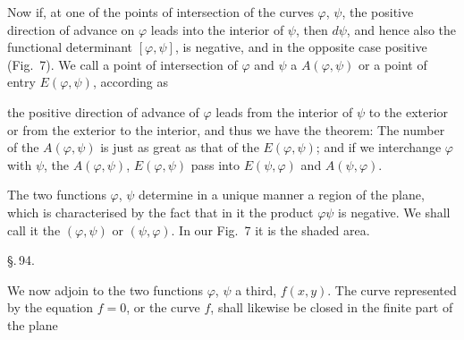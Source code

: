 Now if, at one of the points of intersection of the curves $\varphi$, $\psi$,
the positive direction of advance on $\varphi$ leads into the interior
of $\psi$, then $d\psi$, and hence also the functional determinant
$[\varphi, \psi]$, is negative, and in the opposite case positive (Fig.~7).
We call a point of intersection of $\varphi$ and $\psi$ a
 $A(\varphi, \psi)$ or a point of entry
$E(\varphi,\psi)$, according as


the positive direction of advance of $\varphi$ leads from the interior of $\psi$
to the exterior or from the exterior to the interior, and thus we have the theorem:
The number of the $A(\varphi, \psi)$ is just as great as that of the $E(\varphi, \psi)$;
and if we interchange $\varphi$ with $\psi$, the $A(\varphi, \psi)$, $E(\varphi, \psi)$
pass into $E(\psi, \varphi)$ and $A(\psi, \varphi)$.

The two functions $\varphi$, $\psi$ determine in a unique manner
a region of the plane, which is characterised by the fact that in it
the product $\varphi\psi$ is negative. We shall call it the 
$(\varphi, \psi)$ or $(\psi, \varphi)$. In our Fig.~7 it is the shaded
area.

\begin{center}
\S.\,94.

\end{center}

We now adjoin to the two functions $\varphi$, $\psi$ a third,
$f(x, y)$. The curve represented by the equation $f = 0$,
or the curve $f$, shall likewise be closed in the finite part of the plane
